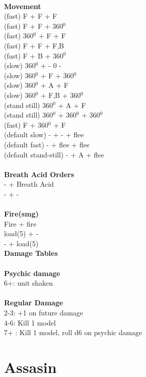 \ \\ {\bf Movement } \\
(fast) F + F + F  \\
(fast) F + F + 360$^0$ \\
(fast) 360$^0$ + F + F \\
(fast) F + F + F,B \\
(fast) F + B + 360$^0$ \\
(slow) 360$^0$ + - 0 - \\
(slow) 360$^0$ + F + 360$^0$ \\
(slow) 360$^0$ + A + F \\
(slow) 360$^0$ + F,B + 360$^0$ \\
(stand still) 360$^0$ + A + F \\
(stand still) 360$^0$ + 360$^0$ + 360$^0$ \\
(fast) F + 360$^0$ + F \\
(default slow) - + - + flee \\
(default fast) - + flee + flee \\
(default stand-still) - + A + flee \\
\ \\ {\bf Breath Acid Orders } \\
- + Breath Acid \\
- + - \\
\ \\ {\bf Fire(smg) } \\
Fire + fire \\
load(5) + - \\
- + load(5) \\



{\bf Damage Tables} \\
\ \\ {\bf Psychic damage } \\
6+: unit shaken \\
\ \\ {\bf Regular Damage } \\
2-3: +1 on future damage \\
4-6: Kill 1 model \\
7+ : Kill 1 model, roll d6 on psychic damage \\









\pagebreak

\section{ Assasin }

